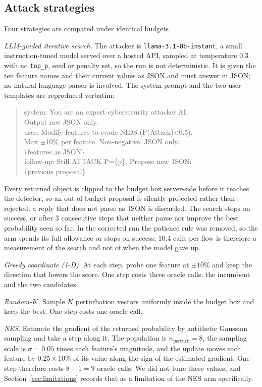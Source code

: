 \documentclass[journal]{IEEEtran}
\providecommand{\citep}[1]{\cite{#1}}
\theoremstyle{definition}
\newcommand{\budgetpct}{10}
\newcommand{\Patience}{3}
\newcommand{\LLMtemp}{0.3}
\newcommand{\LLMmodel}{\texttt{llama-3.1-8b-instant}}
\newcommand{\NESsigma}{0.05}
\newcommand{\NESpop}{8}
\newcommand{\NESstep}{0.25}
\newcommand{\CLlmCalls}{10.4}
\begin{document}
\subsection{Attack strategies}
Four strategies are compared under identical budgets.

\emph{LLM-guided iterative search.} The attacker is \LLMmodel, a small
instruction-tuned model served over a hosted API, sampled at temperature
\LLMtemp{} with no \texttt{top\_p}, seed or penalty set, so the run is not
deterministic. It is given the ten feature names and their current values as
JSON and must answer in JSON; no natural-language parser is involved. The system
prompt and the two user templates are reproduced verbatim:

\begin{quote}\footnotesize\ttfamily\raggedright
system: You are an expert cybersecurity attacker AI.\\
Output raw JSON only.\\[4pt]
user: Modify features to evade NIDS (P(Attack)<0.5).\\
Max $\pm$10\% per feature. Non-negative. JSON only.\\
\{features as JSON\}\\[4pt]
follow-up: Still ATTACK P=\{p\}. Propose new JSON:\\
\{previous proposal\}
\end{quote}

\noindent
Every returned object is clipped to the budget box server-side before it reaches
the detector, so an out-of-budget proposal is silently projected rather than
rejected; a reply that does not parse as JSON is discarded. The search stops on
success, or after \Patience{} consecutive steps that neither parse nor improve
the best probability seen so far. In the corrected run the patience rule was removed, so the arm
spends its full allowance or stops on success; \CLlmCalls{} calls per flow is
therefore a measurement of the search and not of when the model gave up.

\emph{Greedy coordinate (1-D).} At each step, probe one feature at
$\pm\budgetpct$\% and keep the direction that lowers the score. One step costs
three oracle calls: the incumbent and the two candidates.

\emph{Random-$K$.} Sample $K$ perturbation vectors uniformly inside the budget
box and keep the best. One step costs one oracle call.

\emph{NES.} Estimate the gradient of the returned probability by antithetic
Gaussian sampling \citep{ilyas2018nes} and take a step along it. The population
is $n_{\text{perturb}} = \NESpop$, the sampling scale is $\sigma = \NESsigma$
times each feature's magnitude, and the update moves each feature by
$\NESstep \times \budgetpct$\% of its value along the sign of the estimated
gradient. One step therefore costs $\NESpop + 1 = 9$ oracle calls. We did not
tune these values, and Section~\ref{sec:limitations} records that as a
limitation of the NES arm specifically.
\end{document}
